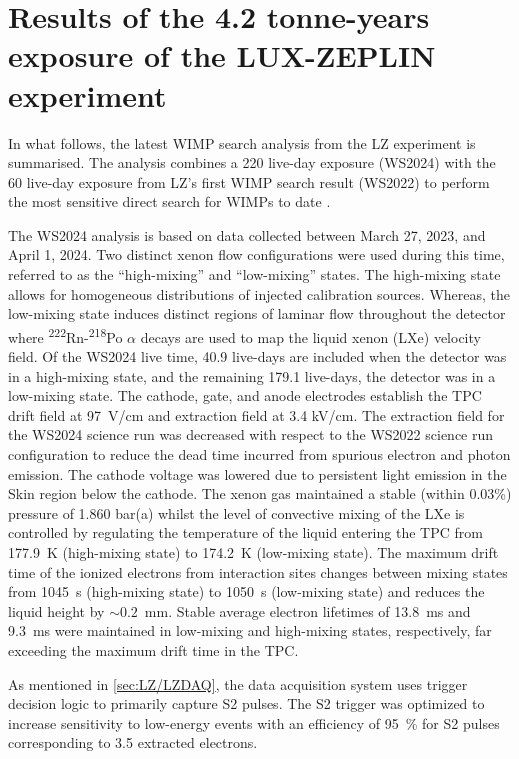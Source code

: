 \chapter{Results of the 4.2 tonne-years exposure of the LUX-ZEPLIN experiment}\label{chap:WS2024Result}
In what follows, the latest WIMP search analysis from the LZ experiment is summarised. The analysis combines a 220 live-day exposure (WS2024) with the 60 live-day exposure from LZ's first WIMP search result (WS2022) \cite{LZ:2022lsv} to perform the most sensitive direct search for WIMPs to date \cite{LZCollaboration:2024lux}.

The WS2024 analysis is based on data collected between March 27, 2023, and April 1, 2024. Two distinct xenon flow configurations were used during this time, referred to as the ``high-mixing'' and ``low-mixing'' states. The high-mixing state allows for homogeneous distributions of injected calibration sources. Whereas, the low-mixing state induces distinct regions of laminar flow throughout the detector where \textsuperscript{222}Rn-\textsuperscript{218}Po $\alpha$ decays are used to map the liquid xenon (LXe) velocity field. Of the WS2024 live time, 40.9 live-days are included when the detector was in a high-mixing state, and the remaining 179.1 live-days, the detector was in a low-mixing state. The cathode, gate, and anode electrodes establish the TPC drift field at 97~V/cm and extraction field at 3.4 kV/cm. The extraction field for the WS2024 science run was decreased with respect to the WS2022 science run configuration to reduce the dead time incurred from spurious electron and photon emission. The cathode voltage was lowered due to persistent light emission in the Skin region below the cathode.
The xenon gas maintained a stable (within 0.03\%) pressure of 1.860 bar(a) whilst the level of convective mixing of the LXe is controlled by regulating the temperature of the liquid entering the TPC from 177.9~K (high-mixing state) to 174.2~K (low-mixing state). The maximum drift time of the ionized electrons from interaction sites changes between mixing states from 1045~\textmu s (high-mixing state) to 1050~\textmu s (low-mixing state) and reduces the liquid height by $\sim0.2$~mm. Stable average electron lifetimes of 13.8~ms and 9.3~ms were maintained in low-mixing and high-mixing states, respectively, far exceeding the maximum drift time in the TPC.

As mentioned in \autoref{sec:LZ/LZDAQ}, the data acquisition system uses trigger decision logic to primarily capture S2 pulses. The S2 trigger was optimized to increase sensitivity to low-energy events with an efficiency of 95~\% for S2 pulses corresponding to 3.5 extracted electrons.

